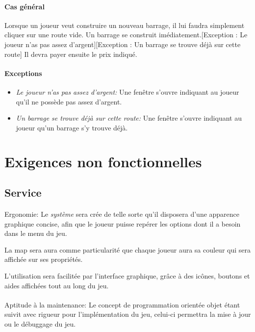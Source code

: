 \documentclass[a4paper,11pt]{report}
\begin{document}
\paragraph{Cas général}
Lorsque un joueur veut construire un nouveau barrage, il lui faudra simplement cliquer sur une route vide. Un barrage se construit imédiatement.[Exception : Le joueur n'as pas assez d'argent][Exception : Un barrage se trouve déjà sur cette route] Il devra payer ensuite le prix indiqué.
\paragraph{Exceptions}
\begin{itemize}
	\item \textit{Le joueur n'as pas assez d'argent:}  Une fenêtre s'ouvre indiquant au joueur qu'il ne possède pas assez d'argent.
	\item \textit{Un barrage se trouve déjà sur cette route:}  Une fenêtre s'ouvre indiquant au joueur qu'un barrage s'y trouve déjà.
\end{itemize}




\newpage
\section{Exigences non fonctionnelles}
\subsection{Service}
\paragraph{}Ergonomie:  \newline
Le \textit{système} sera crée de telle sorte qu'il disposera d’une apparence graphique concise, afin que le joueur puisse repérer les options dont il a besoin dans le menu du jeu.

La map sera aura comme particularité que chaque joueur aura sa couleur qui sera affichée sur ses propriétés.

L'utilisation sera facilitée par l'interface graphique, grâce à des icônes, boutons et aides affichées tout au long du jeu.

\paragraph{}Aptitude à la maintenance:  \newline
Le concept de programmation orientée objet étant suivit avec rigueur pour l’implémentation du jeu, celui-ci permettra la mise à jour ou le débuggage du jeu.
\end{document}
